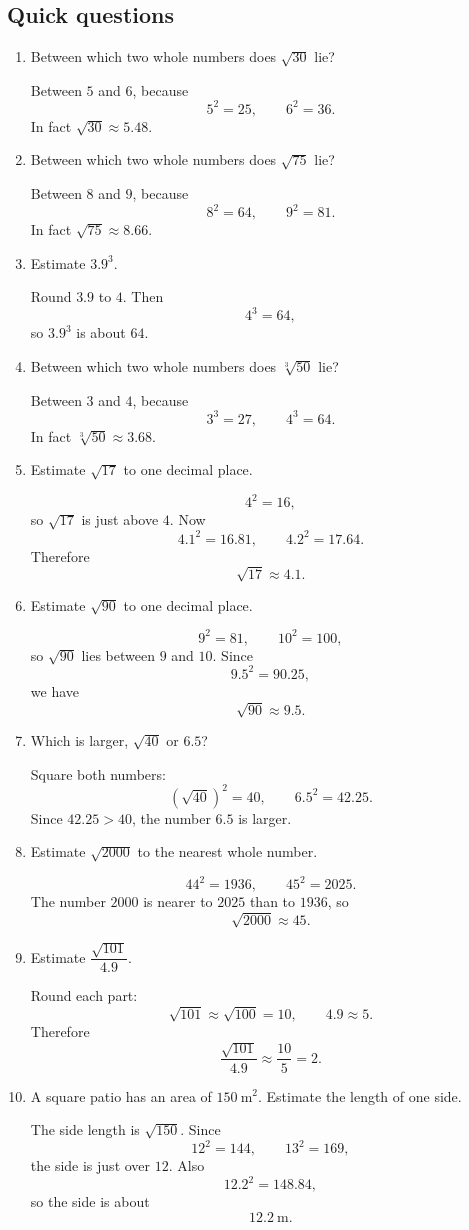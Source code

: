 \documentclass[11pt]{article}
\begin{document}
\subsection*{Quick questions}
\begin{enumerate}
\item Between which two whole numbers does $\sqrt{30}$ lie?

Between $5$ and $6$, because
\[
5^2=25,\qquad 6^2=36.
\]
In fact $\sqrt{30}\approx5.48$.

\item Between which two whole numbers does $\sqrt{75}$ lie?

Between $8$ and $9$, because
\[
8^2=64,\qquad 9^2=81.
\]
In fact $\sqrt{75}\approx8.66$.

\item Estimate $3.9^3$.

Round $3.9$ to $4$. Then
\[
4^3=64,
\]
so $3.9^3$ is about $64$.

\item Between which two whole numbers does $\sqrt[3]{50}$ lie?

Between $3$ and $4$, because
\[
3^3=27,\qquad 4^3=64.
\]
In fact $\sqrt[3]{50}\approx3.68$.

\item Estimate $\sqrt{17}$ to one decimal place.

\[
4^2=16,
\]
so $\sqrt{17}$ is just above $4$. Now
\[
4.1^2=16.81,\qquad 4.2^2=17.64.
\]
Therefore
\[
\sqrt{17}\approx4.1.
\]

\item Estimate $\sqrt{90}$ to one decimal place.

\[
9^2=81,\qquad 10^2=100,
\]
so $\sqrt{90}$ lies between $9$ and $10$. Since
\[
9.5^2=90.25,
\]
we have
\[
\sqrt{90}\approx9.5.
\]

\item Which is larger, $\sqrt{40}$ or $6.5$?

Square both numbers:
\[
\left(\sqrt{40}\right)^2=40,\qquad 6.5^2=42.25.
\]
Since $42.25>40$, the number $6.5$ is larger.

\item Estimate $\sqrt{2000}$ to the nearest whole number.

\[
44^2=1936,\qquad 45^2=2025.
\]
The number $2000$ is nearer to $2025$ than to $1936$, so
\[
\sqrt{2000}\approx45.
\]

\item Estimate $\dfrac{\sqrt{101}}{4.9}$.

Round each part:
\[
\sqrt{101}\approx\sqrt{100}=10,\qquad 4.9\approx5.
\]
Therefore
\[
\frac{\sqrt{101}}{4.9}\approx\frac{10}{5}=2.
\]

\item A square patio has an area of $150\ \mathrm{m^2}$. Estimate the length of one side.

The side length is $\sqrt{150}$. Since
\[
12^2=144,\qquad 13^2=169,
\]
the side is just over $12$. Also
\[
12.2^2=148.84,
\]
so the side is about
\[
12.2\ \mathrm{m}.
\]
\end{enumerate}
\end{document}

